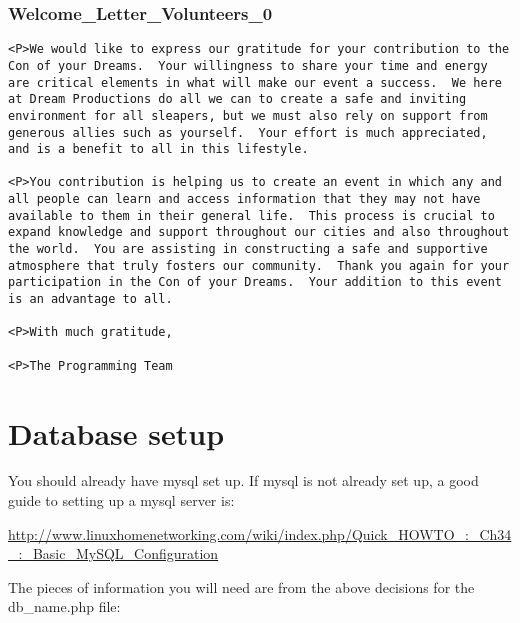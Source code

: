 \documentclass[tablesignature]{scrartcl}
\begin{document}
\subsubsection{Welcome\_{}Letter\_{}Volunteers\_{}0}
\label{sec-3_5_8}

\begin{verbatim}
<P>We would like to express our gratitude for your contribution to the
Con of your Dreams.  Your willingness to share your time and energy
are critical elements in what will make our event a success.  We here
at Dream Productions do all we can to create a safe and inviting
environment for all sleapers, but we must also rely on support from
generous allies such as yourself.  Your effort is much appreciated,
and is a benefit to all in this lifestyle.

<P>You contribution is helping us to create an event in which any and
all people can learn and access information that they may not have
available to them in their general life.  This process is crucial to
expand knowledge and support throughout our cities and also throughout
the world.  You are assisting in constructing a safe and supportive
atmosphere that truly fosters our community.  Thank you again for your
participation in the Con of your Dreams.  Your addition to this event
is an advantage to all.

<P>With much gratitude,

<P>The Programming Team
\end{verbatim}
\section{Database setup}
\label{sec-4}

  You should already have mysql set up.  If mysql is not already set
  up, a good guide to setting up a mysql server is:

\begin{small}
  \href{http://www.linuxhomenetworking.com/wiki/index.php/Quick_HOWTO_:_Ch34_:_Basic_MySQL_Configuration}{http://www.linuxhomenetworking.com/wiki/index.php/Quick\_HOWTO\_:\_Ch34\_:\_Basic\_MySQL\_Configuration}
\end{small}

  The pieces of information you will need are from the above decisions
  for the db\_{}name.php file:
\end{document}
